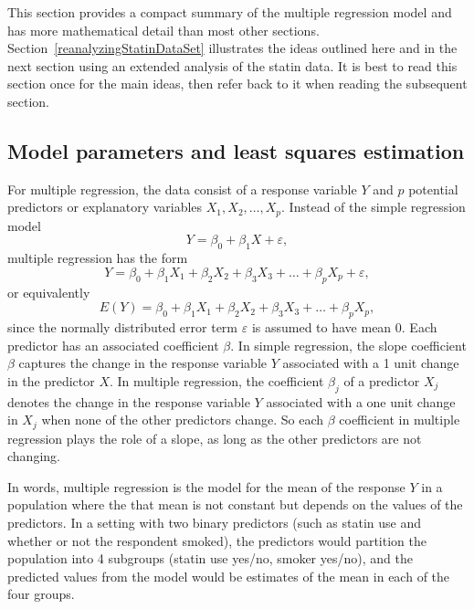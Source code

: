 This section provides a compact summary of the multiple regression model and has more mathematical detail than most other sections.  Section~\ref{reanalyzingStatinDataSet} illustrates the ideas outlined here and in the next section using an extended analysis of the statin data.  It is best to read this section once for the main ideas, then refer back to it when reading the subsequent section.
 
 
\subsection{Model parameters and least squares estimation}
 

For multiple regression, the data consist of a response variable $Y$ and $p$ potential predictors or explanatory variables $X_1, X_2,\ldots, X_p$.   Instead of the simple regression model 
 $${Y} = \beta_{0} + \beta_{1}X + {\varepsilon},$$
 multiple regression has the form
 $${Y} = \beta_{0} +
     \beta_{1}X_{1} + \beta_{2}X_{2} + \beta_{3}X_{3} + \dots +
     \beta_{p}X_{p} + \varepsilon,$$
or equivalently
 $$E(Y) = \beta_{0} + 
     \beta_{1}X_{1} + \beta_{2}X_{2} + \beta_{3}X_{3} + \dots +
     \beta_{p}X_{p},
	 \label{multipleRegressionModel}
	 $$ 
since the normally distributed error term $\varepsilon$ is assumed to have mean 0. Each predictor has an associated coefficient $\beta$.  In simple regression, the slope coefficient $\beta$ captures the change in the response variable $Y$ associated with a 1 unit  change in the predictor $X$.  In multiple regression, the coefficient $\beta_j$ of a predictor $X_j$ denotes the change in the response variable $Y$ associated with a one unit change in $X_j$ when none of the other predictors change.  So each $\beta$ coefficient in multiple regression plays the role of a slope, as long as the other predictors are not changing.

In words, multiple regression is the model for the mean of the response $Y$ in a population where the that mean is not constant but depends on the values of the predictors.  In a setting with two binary predictors (such as statin use and whether or not the respondent smoked), the predictors would partition the population into 4 subgroups (statin use yes/no, smoker yes/no), and the predicted values from the model would be estimates of the mean in each of the four groups.

